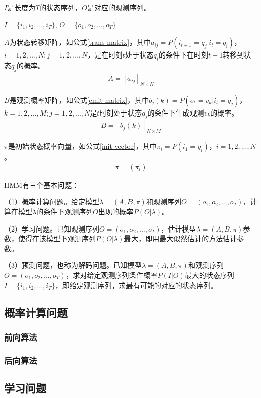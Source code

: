 $I$是长度为$T$的状态序列，$O$是对应的观测序列。
\begin{center}
$I=\{i_1, i_2, ..., i_T\}$, $O = \{o_1, o_2, ..., o_T\}$
\end{center}

$A$为状态转移矩阵，如公式\ref{trans-matrix}，其中$a_{ij}=P(i_{t+1}=q_j|i_t=q_i)$，$i=1,2,...,N; j=1,2,...,N$，是在时刻$t$处于状态$q_i$的条件下在时刻$t+1$转移到状态$q_j$的概率。
\begin{align}
\label{trans-matrix}
A=[a_{ij}]_{N\times{N}}
\end{align}

$B$是观测概率矩阵，如公式\ref{emit-matrix}，其中$b_j(k)=P(o_t=v_k|i_t=q_j)$，$k=1,2,...,M; j=1,2,...,N$是$t$时刻处于状态$q_j$的条件下生成观测$v_k$的概率。
\begin{align}
\label{emit-matrix}
B=[b_{j}(k)]_{N\times{M}}
\end{align}

$\pi$是初始状态概率向量，如公式\ref{init-vector}，其中$\pi_i=P(i_1=q_i)$，$i=1,2,...,N$。
\begin{align}
\label{init-vector}
\pi = (\pi_i)
\end{align}

HMM有三个基本问题：

（1）概率计算问题。给定模型$\lambda=(A,B,\pi)$和观测序列$O=(o_1, o_2, ..., o_T)$，计算在模型$\lambda$的条件下观测序列$O$出现的概率$P(O|\lambda)$。

（2）学习问题。已知观测序列$O=(o_1, o_2, ..., o_T)$，估计模型$\lambda=(A,B,\pi)$参数，使得在该模型下观测序列$P(O|\lambda)$最大，即用最大似然估计的方法估计参数。

（3）预测问题，也称为解码问题。已知模型$\lambda=(A,B,\pi)$和观测序列$O=(o_1, o_2, ..., o_T)$，求对给定观测序列条件概率$P(I|O)$最大的状态序列$I=\{i_1, i_2, ..., i_T\}$，即给定观测序列，求最有可能的对应的状态序列。

\subsection{概率计算问题}
\subsubsection{前向算法}

\subsubsection{后向算法}

\subsection{学习问题}

